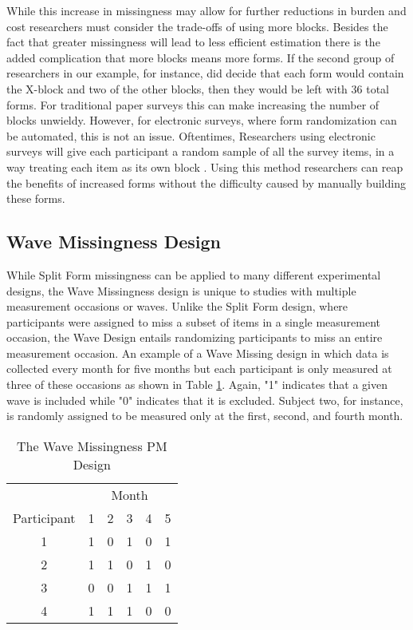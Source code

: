 \documentclass{svjour3}                     %
\begin{document}
While this increase in missingness may allow for further reductions in burden and cost researchers must consider the trade-offs of using more blocks. Besides the fact that greater missingness will lead to less efficient estimation \citep{rhemtulla2016asymptotic} there is the added complication that more blocks means more forms. If the second group of researchers in our example, for instance, did decide that each form would contain the X-block and two of the other blocks, then they would be left with 36 total forms. For traditional paper surveys this can make increasing the number of blocks unwieldy. However, for electronic surveys, where form randomization can be automated, this is not an issue. Oftentimes, Researchers using electronic surveys will give each participant a random sample of all the survey items, in a way treating each item as its own block \citep{silvia2014planned}. Using this method researchers can reap the benefits of increased forms without the difficulty caused by manually building these forms. \par

\subsection{Wave Missingness Design}
\label{sec:1.2}
While Split Form missingness can be applied to many different experimental designs, the Wave Missingness design \citep{little2013planned} is unique to studies with multiple measurement occasions or waves. Unlike the Split Form design, where participants were assigned to miss a subset of items in a single measurement occasion, the Wave Design entails randomizing participants to miss an entire measurement occasion. An example of a Wave Missing design in which data is collected every month for five months but each participant is only measured at three of these occasions as shown in Table \ref{tab:table11}. Again, "1" indicates that a given wave is included while "0" indicates that it is excluded. Subject two, for instance, is randomly assigned to be measured only at the first, second, and fourth month. \par

\begin{table}[b!]
	\centering
	\caption{The Wave Missingness PM Design}
	\label{tab:table11}
	\setlength{\tabcolsep}{0.75cm}
	\begin{tabular}{c|ccccc}
		\toprule
		& \multicolumn{5}{c}{Month} \\
		Participant & 1 & 2 & 3 & 4 & 5 \\
		\midrule
		1 & 1 & 0 & 1 & 0 & 1 \\
		2 & 1 & 1 & 0 & 1 & 0 \\
		3 & 0 & 0 & 1 & 1 & 1 \\
		4 & 1 & 1 & 1 & 0 & 0 \\
		\bottomrule
	\end{tabular}
\end{table}
\end{document}
